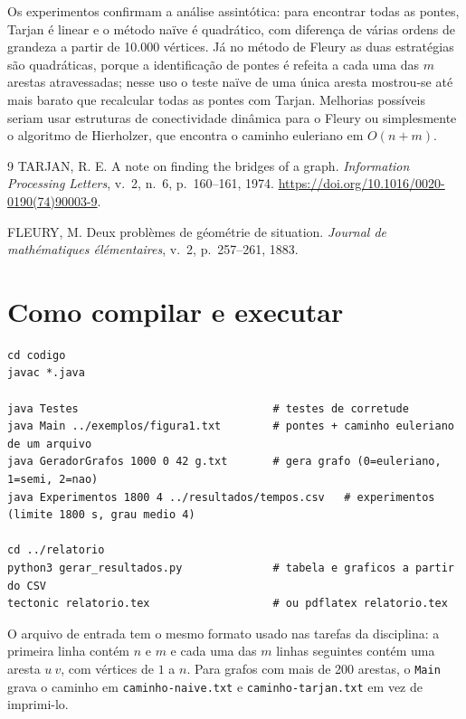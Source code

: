 \documentclass[a4paper,11pt]{article}
\begin{document}
Os experimentos confirmam a análise assintótica: para encontrar todas as pontes, Tarjan é linear e o
método naïve é quadrático, com diferença de várias ordens de grandeza a partir de 10.000 vértices.
Já no método de Fleury as duas estratégias são quadráticas, porque a identificação de pontes é refeita
a cada uma das $m$ arestas atravessadas; nesse uso o teste naïve de uma única aresta mostrou-se até
mais barato que recalcular todas as pontes com Tarjan. Melhorias possíveis seriam usar estruturas de
conectividade dinâmica para o Fleury ou simplesmente o algoritmo de Hierholzer, que encontra o caminho
euleriano em $O(n+m)$.

\begin{thebibliography}{9}
TARJAN, R. E. A note on finding the bridges of a graph. \emph{Information Processing Letters},
v.~2, n.~6, p.~160--161, 1974. \url{https://doi.org/10.1016/0020-0190(74)90003-9}.

FLEURY, M. Deux problèmes de géométrie de situation. \emph{Journal de mathématiques élémentaires},
v.~2, p.~257--261, 1883.
\end{thebibliography}

\appendix
\section{Como compilar e executar}\label{ap:uso}

\begin{lstlisting}
cd codigo
javac *.java

java Testes                              # testes de corretude
java Main ../exemplos/figura1.txt        # pontes + caminho euleriano de um arquivo
java GeradorGrafos 1000 0 42 g.txt       # gera grafo (0=euleriano, 1=semi, 2=nao)
java Experimentos 1800 4 ../resultados/tempos.csv   # experimentos (limite 1800 s, grau medio 4)

cd ../relatorio
python3 gerar_resultados.py              # tabela e graficos a partir do CSV
tectonic relatorio.tex                   # ou pdflatex relatorio.tex
\end{lstlisting}

O arquivo de entrada tem o mesmo formato usado nas tarefas da disciplina: a primeira linha contém
$n$ e $m$ e cada uma das $m$ linhas seguintes contém uma aresta $u\ v$, com vértices de $1$ a $n$.
Para grafos com mais de 200 arestas, o \texttt{Main} grava o caminho em \texttt{caminho-naive.txt} e
\texttt{caminho-tarjan.txt} em vez de imprimi-lo.
\end{document}

